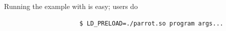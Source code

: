 






Running the example with \parrot is easy; users do
\vspace{-2 mm}
\begin{small}
\begin{verbatim}
                     $ LD_PRELOAD=./parrot.so program args...
\end{verbatim}
\end{small}
\vspace{-2 mm}

